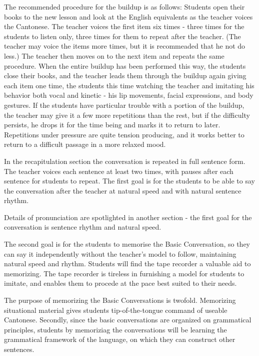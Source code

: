 The recommended procedure for the buildup is as follows: Students open their books to the new lesson and look at the English equivalents as the teacher voices the Cantonese. The teacher voices the first item six times - three times for the students to listen only, three times for them to repeat after the teacher. (The teacher may voice the items more times, but it is recommeaded that he not do less.) The teacher then moves on to the next item and repeats the same procedure. When the entire buildup has been performed this way, the students close their books, and the teacher leads them through the buildup again giving each item one time, the students this time watching the teacher and imitating his behavior both vocal and kinetic - his lip movements, facial expressions, and body gestures. If the students have particular trouble with a portion of the buildup, the teacher may give it a few more repetitions than the rest, but if the difficulty persists, he drops it for the time being and marks it to return to later. Repetitions under pressure are quite tension producing, and it works better to return to a difficult passage in a more relaxed mood.

In the recapitulation section the conversation is repeated in full sentence form. The teacher voices each sentence at least two times, with pauses after each sentence for students to repeat. The first goal is for the students to be able to say the conversation after the teacher at natural speed and with natural sentence rhythm.

Details of pronunciation are spotlighted in another section - the first goal for the conversation is sentence rhythm and natural speed.

The second goal is for the students to memorise the Basic Conversation, so they can say it independently without the teacher's model to follow, maintaining natural speed and rhythm. Students will find the tape recorder a valuable aid to memorizing. The tape recorder is tireless in furnishing a model for students to imitate, and enables them to procede at the pace best suited to their needs.

The purpose of memorizing the Basic Conversations is twofold. Memorizing situational material gives students tip-of-the-tongue command of useable Cantonese. Secondly, since the basic conversations are organized on grammatical principles, students by memoriziag the conversations will be learning the grammatical framework of the language, on which they can construct other sentences.

